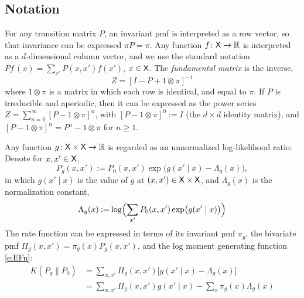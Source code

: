 \documentclass[final,12pt]{colt2018} %
\def\EFn#1{\Lambda_{#1}}
\def\state{{\sf X}}
\newcommand{\field}[1]{\mathbb{#1}}
\def\Re{\field{R}}
\def\eqdef{\mathbin{:=}}
\def\Re{\field{R}}
\begin{document}
\subsection{Notation}



For any transition matrix $P$, an invariant pmf  is interpreted as a row vector, so that invariance can be expressed $\pi P=\pi$.   Any function $f\colon\state\to\Re$ is interpreted as a $d$-dimensional column vector,  and we use the standard notation $Pf\, (x) =   \sum_{x'}P(x,x')f(x')$,  $x\in\state$.
The \textit{fundamental matrix} is   the inverse, 
\begin{equation}
Z = [I - P + 1\otimes \pi]^{-1}
\label{e:fundKernGen}
\end{equation}
where $1\otimes \pi$ is a matrix in which each row is identical, and equal to $ \pi$.  
If $P$ is irreducible and aperiodic, then it can be expressed as the power series  
$Z = \sum_{n=0}^\infty  [P - 1\otimes \pi]^n
$,
with $ [P - 1\otimes \pi]^0 \eqdef I$  (the $d\times d$ identity matrix),
and $ [P - 1\otimes \pi]^n  = P^n - 1\otimes \pi$  for $n\ge 1$.  

Any function $g\colon\state\times\state\to\Re$ is regarded as an unnormalized log-likelihood ratio:  Denote for $x,x'\in\state$,
\begin{equation}
P_g(x,x') \eqdef P_0(x,x')\exp\bigl(  g( x' \mid x )  -  \EFn{g}(x)    \bigr),  
\label{e:Ph-a}
\end{equation}
in which $g( x' \mid x )$ is the value of $g$ at $(x,x')\in\state\times\state$, and $ \EFn{g}(x)$ is the normalization constant,
\begin{equation}
    \EFn{g}(x)     
\eqdef  \log\Bigl( \sum_{x'} P_0(x,x')\exp\bigl(  g(x'\mid  x)     \bigr) \Bigr)
\label{e:EFn}
\end{equation}
The rate function can be expressed in terms of  its  invariant pmf $\pi_g$, the bivariate pmf  $\Pi_g(x,x') = \pi_g(x) P_g(x,x')  $, and the log moment generating function \eqref{e:EFn}:
\begin{equation}
\begin{aligned}
K(P_g\| P_0) &= \sum_{x,x'} \Pi_g(x,x')    \bigl[  g( x' \mid x )  -  \EFn{g}(x) \bigr]
\\
&= \sum_{x,x'}\Pi_g(x,x')      g( x' \mid x )  -     \sum_x \pi_g(x) \EFn{g}(x)  
\end{aligned}
\label{e:DVrate-h}
\end{equation}  
\end{document}
